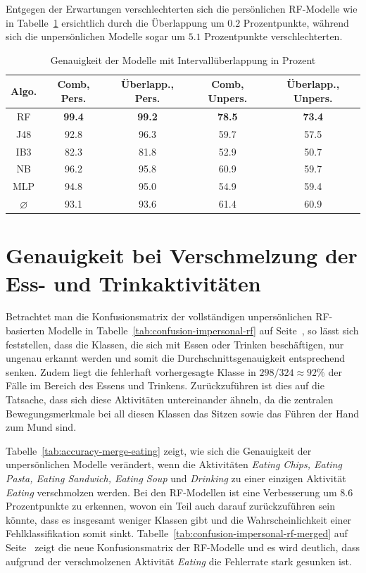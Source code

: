 Entgegen der Erwartungen verschlechterten sich die persönlichen \acs{RF}-Modelle wie in Tabelle~\ref{tab:accuracy-overlap} ersichtlich durch die Überlappung um $0.2$ Prozentpunkte, während sich die unpersönlichen Modelle sogar um $5.1$ Prozentpunkte verschlechterten.

\begin{table}
\centering
\begin{tabular}{|c|c|c||c|c|}
	\hline 
	\textbf{Algo.} & \textbf{Comb, Pers.} & \textbf{Überlapp., Pers.} &\textbf{Comb, Unpers.} & \textbf{Überlapp., Unpers.} \\ 
	\hline 
	\acs{RF} & \textbf{99.4} & \textbf{99.2} & \textbf{78.5} & \textbf{73.4} \\ 
	\acs{J48} & 92.8 & 96.3 & 59.7 & 57.5 \\ 
	\acs{IB}3 & 82.3 & 81.8 & 52.9 & 50.7 \\ 
	\acs{NB} & 96.2 & 95.8 & 60.9 & 59.7 \\ 
	\acs{MLP} & 94.8 & 95.0 & 54.9 & 59.4 \\ 
	\hline 
	$\varnothing$ & 93.1 & 93.6 & 61.4 & 60.9 \\ 
	\hline
\end{tabular} 
\caption{Genauigkeit der Modelle mit Intervallüberlappung in Prozent}
\label{tab:accuracy-overlap}
\end{table}

\section{Genauigkeit bei Verschmelzung der Ess- und Trinkaktivitäten}

Betrachtet man die Konfusionsmatrix der vollständigen unpersönlichen \acs{RF}-basierten Modelle in Tabelle~\ref{tab:confusion-impersonal-rf} auf Seite~\pageref{tab:confusion-impersonal-rf}, so lässt sich feststellen, dass die Klassen, die sich mit Essen oder Trinken beschäftigen, nur ungenau erkannt werden und somit die Durchschnittsgenauigkeit entsprechend senken. Zudem liegt die fehlerhaft vorhergesagte Klasse in $298/324 \approx 92 \%$ der Fälle im Bereich des Essens und Trinkens. Zurückzuführen ist dies auf die Tatsache, dass sich diese Aktivitäten untereinander ähneln, da die zentralen Bewegungsmerkmale bei all diesen Klassen das Sitzen sowie das Führen der Hand zum Mund sind.

Tabelle~\ref{tab:accuracy-merge-eating} zeigt, wie sich die Genauigkeit der unpersönlichen Modelle verändert, wenn die Aktivitäten \textit{Eating Chips, Eating Pasta, Eating Sandwich, Eating Soup} und \textit{Drinking} zu einer einzigen Aktivität \textit{Eating} verschmolzen werden. Bei den \ac{RF}-Modellen ist eine Verbesserung um $8.6$ Prozentpunkte zu erkennen, wovon ein Teil auch darauf zurückzuführen sein könnte, dass es insgesamt weniger Klassen gibt und die Wahrscheinlichkeit einer Fehlklassifikation somit sinkt. Tabelle~\ref{tab:confusion-impersonal-rf-merged} auf Seite~\pageref{tab:confusion-impersonal-rf-merged} zeigt die neue Konfusionsmatrix der \ac{RF}-Modelle und es wird deutlich, dass aufgrund der verschmolzenen Aktivität \textit{Eating} die Fehlerrate stark gesunken ist.

